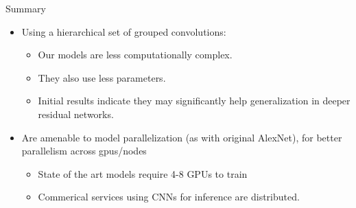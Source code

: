 \documentclass[t,xcolor=dvipsnames]{beamer}
\begin{document}
\begin{frame}{Summary}

  \begin{itemize}
	\item Using a hierarchical set of grouped convolutions:
	\begin{itemize}
    	\item Our models are \alert{less computationally complex}.
	    \item They also use \alert{less parameters}.
	    \item Initial results indicate they may significantly help generalization in deeper residual networks.
	\end{itemize}
	\item Are amenable to \alert{model parallelization} (as with original AlexNet), for better parallelism across gpus/nodes
	\begin{itemize}
	    \item State of the art models require 4-8 GPUs to train
	    \item Commerical services using CNNs for inference are distributed.
	\end{itemize}
  \end{itemize}
\end{frame}
\end{document}
